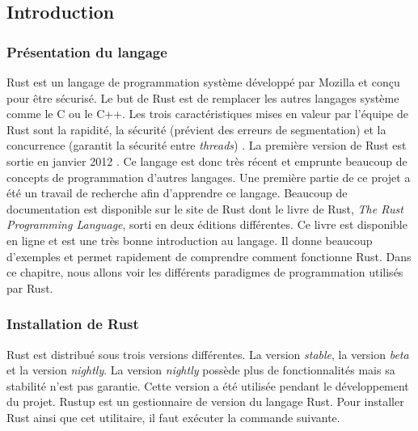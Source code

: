
\subsection{Introduction}
\subsubsection{Présentation du langage}
Rust est un langage de programmation système développé par Mozilla et conçu pour
être sécurisé. Le but de Rust est de remplacer les autres langages système comme
le C ou le C++. Les trois caractéristiques mises en valeur par l'équipe de Rust
sont la rapidité, la sécurité (prévient des erreurs de segmentation) et la concurrence
(garantit la sécurité entre \textit{threads}) \cite{ref28}. La première version
de Rust est sortie en janvier 2012 \cite{ref28}. Ce langage est donc très récent
et emprunte beaucoup de concepts de programmation d'autres langages. Une première
partie de ce projet a été un travail de recherche afin d'apprendre ce langage.
Beaucoup de documentation est disponible sur le site de Rust dont le livre
de Rust, \textit{The Rust Programming Language}, sorti en deux éditions différentes.
Ce livre est disponible en ligne et est une très bonne introduction au langage.
Il donne beaucoup d'exemples et permet rapidement de comprendre comment fonctionne
Rust. Dans ce chapitre, nous allons voir les différents paradigmes de programmation
utilisés par Rust.


\subsubsection{Installation de Rust}
Rust est distribué sous trois versions différentes. La version \textit{stable},
la version \textit{beta} et la version \textit{nightly}. La version \textit{nightly}
possède plus de fonctionnalités mais sa stabilité n'est pas garantie. Cette version
a été utilisée pendant le développement du projet. Rustup est un gestionnaire de
version du langage Rust. Pour installer Rust ainsi que cet utilitaire, il faut
exécuter la commande suivante.


